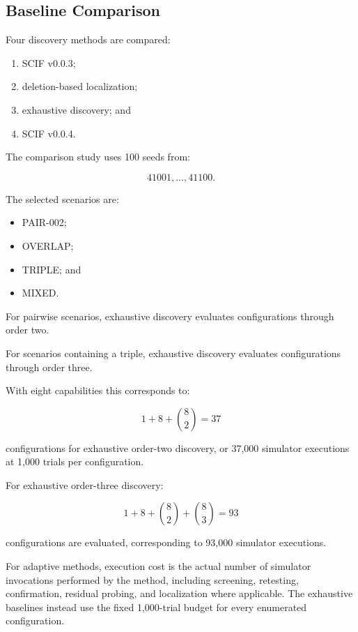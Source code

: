 \subsection{Baseline Comparison}

Four discovery methods are compared:

\begin{enumerate}
\def\labelenumi{\arabic{enumi}.}
\tightlist
\item
  SCIF v0.0.3;
\item
  deletion-based localization;
\item
  exhaustive discovery; and
\item
  SCIF v0.0.4.
\end{enumerate}

The comparison study uses 100 seeds from:

\[
41001,\ldots,41100.
\]

The selected scenarios are:

\begin{itemize}
\tightlist
\item
  PAIR-002;
\item
  OVERLAP;
\item
  TRIPLE; and
\item
  MIXED.
\end{itemize}

For pairwise scenarios, exhaustive discovery evaluates configurations through order two.

For scenarios containing a triple, exhaustive discovery evaluates configurations through order three.

With eight capabilities this corresponds to:

\[
1 + 8 + \binom{8}{2}
=
37
\]

configurations for exhaustive order-two discovery, or 37,000 simulator executions at 1,000 trials per configuration.

For exhaustive order-three discovery:

\[
1 + 8 + \binom{8}{2} + \binom{8}{3}
=
93
\]

configurations are evaluated, corresponding to 93,000 simulator executions.

For adaptive methods, execution cost is the actual number of simulator invocations performed by the method, including screening, retesting, confirmation, residual probing, and localization where applicable. The exhaustive baselines instead use the fixed 1,000-trial budget for every enumerated configuration.

